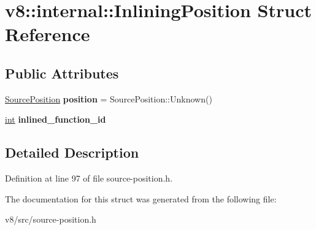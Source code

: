 \hypertarget{structv8_1_1internal_1_1InliningPosition}{}\section{v8\+:\+:internal\+:\+:Inlining\+Position Struct Reference}
\label{structv8_1_1internal_1_1InliningPosition}
\subsection*{Public Attributes}
\begin{DoxyCompactItemize}
\item 
\mbox{\label{structv8_1_1internal_1_1InliningPosition_a9d11db3da7aa464b9d0c5aa0a363fc9e}} 
\mbox{\hyperlink{classv8_1_1internal_1_1SourcePosition}{Source\+Position}} {\bfseries position} = Source\+Position\+::\+Unknown()
\item 
\mbox{\label{structv8_1_1internal_1_1InliningPosition_a731db837cd9ee5c923e04d054e3f9e72}} 
\mbox{\hyperlink{classint}{int}} {\bfseries inlined\+\_\+function\+\_\+id}
\end{DoxyCompactItemize}


\subsection{Detailed Description}


Definition at line 97 of file source-\/position.\+h.



The documentation for this struct was generated from the following file\+:\begin{DoxyCompactItemize}
\item 
v8/src/source-\/position.\+h\end{DoxyCompactItemize}
